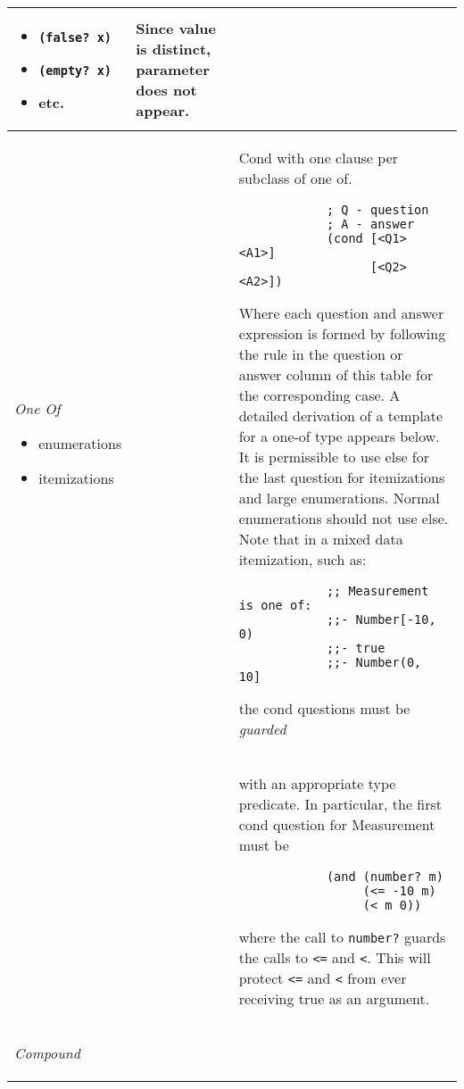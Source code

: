 \documentclass[11pt,a4paper]{report}
\begin{document}
\begin{longtable}{|p{1.5 in}|p{1.5 in}|p{1.5 in}|}
\begin{itemize}
				\item \texttt{(false? x)}
				\item \texttt{(empty? x)}
				\item etc.
			\end{itemize}
			& Since value is distinct, parameter does not appear. \mint[linenos=false]{racket}{(...)} \\
		\hline
			\emph{One Of}
			\begin{itemize}
				\item enumerations
				\item itemizations
			\end{itemize} 
			& 
			& Cond with one clause per subclass of one of.
			\begin{verbatim}
            ; Q - question
            ; A - answer
            (cond [<Q1> <A1>]
                  [<Q2> <A2>])
            \end{verbatim}
			Where each question and answer expression is
			formed by following the rule in the question or
			answer column of this table for the corresponding
			case. A detailed derivation of a template for a one-of
			type appears below.
			\newline \newline
			It is permissible to use else for the last question for
			itemizations and large enumerations. Normal
			enumerations should not use else.
			\newline \newline
			Note that in a mixed data itemization, such as:
			\begin{verbatim}
			;; Measurement is one of:
			;;- Number[-10, 0)
			;;- true
			;;- Number(0, 10]
			\end{verbatim}
			the cond questions must be \emph{guarded} \\ 
		\hline 
			&
			&  with an appropriate type predicate. In particular, the first
			cond question for Measurement must be
			\begin{verbatim}
		    (and (number? m)
		         (<= -10 m)
		         (< m 0))
			\end{verbatim}
			where the call to \texttt{number?} guards the calls to \texttt{<=} and
			\texttt{<}. This will protect \texttt{<=} and \texttt{<} from ever receiving true
			as an argument.\\
		\hline
			\emph{Compound}
			\begin{itemize}

\end{itemize}
\end{longtable}
\end{document}
